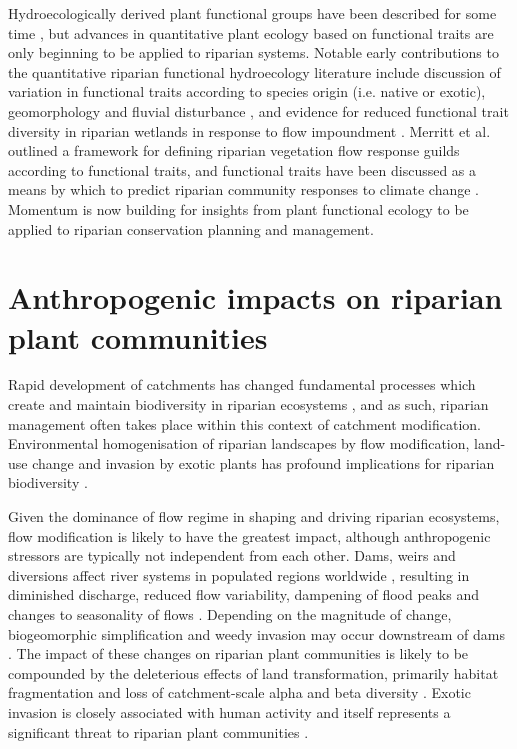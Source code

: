 \documentclass[openright,12pt,a4paper]{memoir}
\begin{document}
Hydroecologically derived plant functional groups have been described for some time \citep{Stromberg2010, Casanova2011}, but advances in quantitative plant ecology based on functional traits are only beginning to be applied to riparian systems. Notable early contributions to the quantitative riparian functional hydroecology literature include discussion of variation in functional traits according to species origin (i.e. native or exotic), geomorphology and fluvial disturbance \citep{Kyle2009, Kyle2009a}, and evidence for reduced functional trait diversity in riparian wetlands in response to flow impoundment \citep{Catford2011}. Merritt et al. \citep{Merritt2010} outlined a framework for defining riparian vegetation flow response guilds according to functional traits, and functional traits have been discussed as a means by which to predict riparian community responses to climate change \citep{Catford2012a, Kominoski2013}. Momentum is now building for insights from plant functional ecology to be applied to riparian conservation planning and management.

\section{Anthropogenic impacts on riparian plant communities}
Rapid development of catchments has changed fundamental processes which create and maintain biodiversity in riparian ecosystems \citep{Nilsson2002}, and as such, riparian management often takes place within this context of catchment modification. Environmental homogenisation of riparian landscapes by flow modification, land-use change and invasion by exotic plants has profound implications for riparian biodiversity \citep{Brierley1999, Richardson2007, Poff2010}. 

Given the dominance of flow regime in shaping and driving riparian ecosystems, flow modification is likely to have the greatest impact, although anthropogenic stressors are typically not independent from each other. Dams, weirs and diversions affect river systems in populated regions worldwide \citep{Nilsson2002}, resulting in diminished discharge, reduced flow variability, dampening of flood peaks and changes to seasonality of flows \citep{Graf2006, Singer2007}. Depending on the magnitude of change, biogeomorphic simplification and weedy invasion may occur downstream of dams \citep{Graf2006, Naiman2008, Catford2011}. The impact of these changes on riparian plant communities is likely to be compounded by the deleterious effects of land transformation, primarily habitat fragmentation and loss of catchment-scale alpha and beta diversity \citep{Vitousek1997, Gerstner2014}. Exotic invasion is closely associated with human activity \citep{Vitousek1996} and itself represents a significant threat to riparian plant communities \citep{Richardson2007}.
\end{document}
